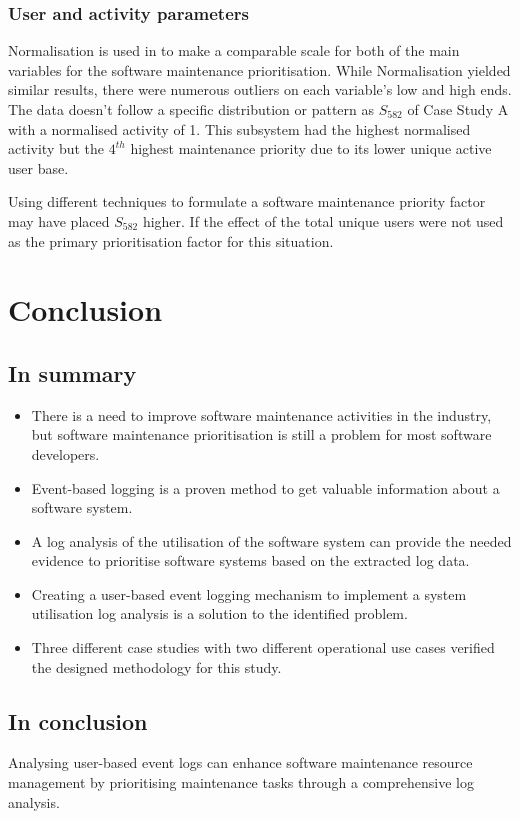 \subsubsection{User and activity parameters}
\par Normalisation is used in  to make a comparable scale for both of the main variables for the software maintenance prioritisation. While Normalisation yielded similar results, there were numerous outliers on each variable's low and high ends. The data doesn't follow a specific distribution or pattern as $S_{582}$ of Case Study A with a normalised activity of 1. This subsystem had the highest normalised activity but the $4^{th}$ highest maintenance priority due to its lower unique active user base.\par Using different techniques to formulate a software maintenance priority factor may have placed $S_{582}$ higher. If the effect of the total unique users were not used as the primary prioritisation factor for this situation. 

\clearpage

\section{Conclusion}

\subsection{In summary}
\begin{itemize}
	\item There is a need to improve software maintenance activities in the industry, but software maintenance prioritisation is still a problem for most software developers.
	\item Event-based logging is a proven method to get valuable information about a software system.
	\item A log analysis of the utilisation of the software system can provide the needed evidence to prioritise software systems based on the extracted log data.
	\item Creating a user-based event logging mechanism to implement a system utilisation log analysis is a solution to the identified problem.
	\item Three different case studies with two different operational use cases verified the designed methodology for this study.
\end{itemize}

\subsection{In conclusion}
Analysing user-based event logs can enhance software maintenance resource management by prioritising maintenance tasks through a comprehensive log analysis.